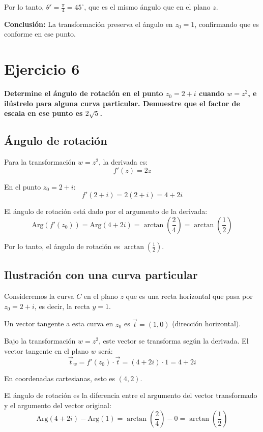\documentclass{article}
\begin{document}
Por lo tanto, $\theta' = \frac{\pi}{4} = 45^\circ$, que es el mismo ángulo que en el plano $z$.

\textbf{Conclusión:} La transformación preserva el ángulo en $z_0 = 1$, confirmando que es conforme en ese punto.

\newpage
\section*{Ejercicio 6}

\textbf{Determine el ángulo de rotación en el punto $z_0 = 2 + i$ cuando $w = z^2$, e ilústrelo para alguna curva particular. Demuestre que el factor de escala en ese punto es $2\sqrt{5}$.}

\subsection*{Ángulo de rotación}

Para la transformación $w = z^2$, la derivada es:
$$f'(z) = 2z$$

En el punto $z_0 = 2 + i$:
$$f'(2 + i) = 2(2 + i) = 4 + 2i$$

El ángulo de rotación está dado por el argumento de la derivada:
$$\text{Arg}(f'(z_0)) = \text{Arg}(4 + 2i) = \arctan\left(\frac{2}{4}\right) = \arctan\left(\frac{1}{2}\right)$$

Por lo tanto, el ángulo de rotación es $\arctan\left(\frac{1}{2}\right)$.

\subsection*{Ilustración con una curva particular}

Consideremos la curva $C$ en el plano $z$ que es una recta horizontal que pasa por $z_0 = 2 + i$, es decir, la recta $y = 1$.

Un vector tangente a esta curva en $z_0$ es $\vec{t} = (1, 0)$ (dirección horizontal).

Bajo la transformación $w = z^2$, este vector se transforma según la derivada. El vector tangente en el plano $w$ será:
$$\vec{t}_w = f'(z_0) \cdot \vec{t} = (4 + 2i) \cdot 1 = 4 + 2i$$

En coordenadas cartesianas, esto es $(4, 2)$.

El ángulo de rotación es la diferencia entre el argumento del vector transformado y el argumento del vector original:
$$\text{Arg}(4 + 2i) - \text{Arg}(1) = \arctan\left(\frac{2}{4}\right) - 0 = \arctan\left(\frac{1}{2}\right)$$
\end{document}
